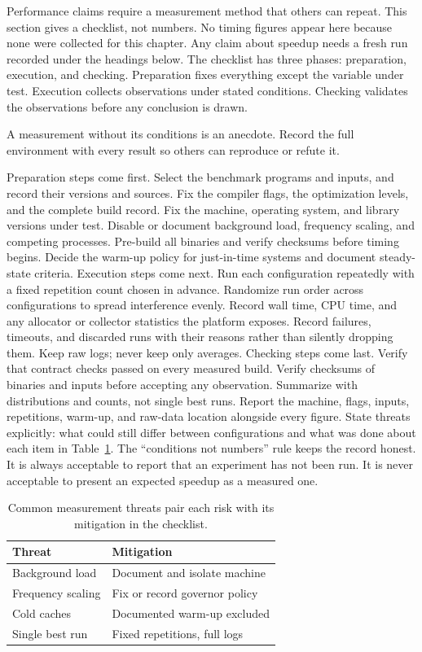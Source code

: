 Performance claims require a measurement method that others can repeat.
This section gives a checklist, not numbers.
No timing figures appear here because none were collected for this chapter.
Any claim about speedup needs a fresh run recorded under the headings below.
The checklist has three phases: preparation, execution, and checking.
Preparation fixes everything except the variable under test.
Execution collects observations under stated conditions.
Checking validates the observations before any conclusion is drawn.
\begin{ccnote}
A measurement without its conditions is an anecdote.
Record the full environment with every result so others can reproduce or refute it.
\end{ccnote}
Preparation steps come first.
Select the benchmark programs and inputs, and record their versions and sources.
Fix the compiler flags, the optimization levels, and the complete build record.
Fix the machine, operating system, and library versions under test.
Disable or document background load, frequency scaling, and competing processes.
Pre-build all binaries and verify checksums before timing begins.
Decide the warm-up policy for just-in-time systems and document steady-state criteria.
Execution steps come next.
Run each configuration repeatedly with a fixed repetition count chosen in advance.
Randomize run order across configurations to spread interference evenly.
Record wall time, CPU time, and any allocator or collector statistics the platform exposes.
Record failures, timeouts, and discarded runs with their reasons rather than silently dropping them.
Keep raw logs; never keep only averages.
Checking steps come last.
Verify that contract checks passed on every measured build.
Verify checksums of binaries and inputs before accepting any observation.
Summarize with distributions and counts, not single best runs.
Report the machine, flags, inputs, repetitions, warm-up, and raw-data location alongside every figure.
State threats explicitly: what could still differ between configurations and what was done about each item in Table~\ref{tab:ch38-threats}.
The \enquote{conditions not numbers} rule keeps the record honest.
It is always acceptable to report that an experiment has not been run.
It is never acceptable to present an expected speedup as a measured one.

\begin{table}[htbp]
\centering
\caption{Common measurement threats pair each risk with its mitigation in the checklist.}
\label{tab:ch38-threats}
\begin{tabular}{ll}
\toprule
Threat & Mitigation \\
\midrule
Background load & Document and isolate machine \\
Frequency scaling & Fix or record governor policy \\
Cold caches & Documented warm-up excluded \\
Single best run & Fixed repetitions, full logs \\
\bottomrule
\end{tabular}
\end{table}

